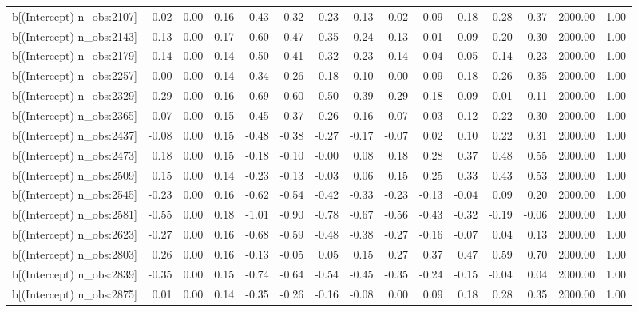 \begin{table}[ht]
\begin{tabular}{rrrrrrrrrrrrrrr}
  b[(Intercept) n\_obs:2107] & -0.02 & 0.00 & 0.16 & -0.43 & -0.32 & -0.23 & -0.13 & -0.02 & 0.09 & 0.18 & 0.28 & 0.37 & 2000.00 & 1.00 \\ 
  b[(Intercept) n\_obs:2143] & -0.13 & 0.00 & 0.17 & -0.60 & -0.47 & -0.35 & -0.24 & -0.13 & -0.01 & 0.09 & 0.20 & 0.30 & 2000.00 & 1.00 \\ 
  b[(Intercept) n\_obs:2179] & -0.14 & 0.00 & 0.14 & -0.50 & -0.41 & -0.32 & -0.23 & -0.14 & -0.04 & 0.05 & 0.14 & 0.23 & 2000.00 & 1.00 \\ 
  b[(Intercept) n\_obs:2257] & -0.00 & 0.00 & 0.14 & -0.34 & -0.26 & -0.18 & -0.10 & -0.00 & 0.09 & 0.18 & 0.26 & 0.35 & 2000.00 & 1.00 \\ 
  b[(Intercept) n\_obs:2329] & -0.29 & 0.00 & 0.16 & -0.69 & -0.60 & -0.50 & -0.39 & -0.29 & -0.18 & -0.09 & 0.01 & 0.11 & 2000.00 & 1.00 \\ 
  b[(Intercept) n\_obs:2365] & -0.07 & 0.00 & 0.15 & -0.45 & -0.37 & -0.26 & -0.16 & -0.07 & 0.03 & 0.12 & 0.22 & 0.30 & 2000.00 & 1.00 \\ 
  b[(Intercept) n\_obs:2437] & -0.08 & 0.00 & 0.15 & -0.48 & -0.38 & -0.27 & -0.17 & -0.07 & 0.02 & 0.10 & 0.22 & 0.31 & 2000.00 & 1.00 \\ 
  b[(Intercept) n\_obs:2473] & 0.18 & 0.00 & 0.15 & -0.18 & -0.10 & -0.00 & 0.08 & 0.18 & 0.28 & 0.37 & 0.48 & 0.55 & 2000.00 & 1.00 \\ 
  b[(Intercept) n\_obs:2509] & 0.15 & 0.00 & 0.14 & -0.23 & -0.13 & -0.03 & 0.06 & 0.15 & 0.25 & 0.33 & 0.43 & 0.53 & 2000.00 & 1.00 \\ 
  b[(Intercept) n\_obs:2545] & -0.23 & 0.00 & 0.16 & -0.62 & -0.54 & -0.42 & -0.33 & -0.23 & -0.13 & -0.04 & 0.09 & 0.20 & 2000.00 & 1.00 \\ 
  b[(Intercept) n\_obs:2581] & -0.55 & 0.00 & 0.18 & -1.01 & -0.90 & -0.78 & -0.67 & -0.56 & -0.43 & -0.32 & -0.19 & -0.06 & 2000.00 & 1.00 \\ 
  b[(Intercept) n\_obs:2623] & -0.27 & 0.00 & 0.16 & -0.68 & -0.59 & -0.48 & -0.38 & -0.27 & -0.16 & -0.07 & 0.04 & 0.13 & 2000.00 & 1.00 \\ 
  b[(Intercept) n\_obs:2803] & 0.26 & 0.00 & 0.16 & -0.13 & -0.05 & 0.05 & 0.15 & 0.27 & 0.37 & 0.47 & 0.59 & 0.70 & 2000.00 & 1.00 \\ 
  b[(Intercept) n\_obs:2839] & -0.35 & 0.00 & 0.15 & -0.74 & -0.64 & -0.54 & -0.45 & -0.35 & -0.24 & -0.15 & -0.04 & 0.04 & 2000.00 & 1.00 \\ 
  b[(Intercept) n\_obs:2875] & 0.01 & 0.00 & 0.14 & -0.35 & -0.26 & -0.16 & -0.08 & 0.00 & 0.09 & 0.18 & 0.28 & 0.35 & 2000.00 & 1.00 \\ 

\end{tabular}
\end{table}
